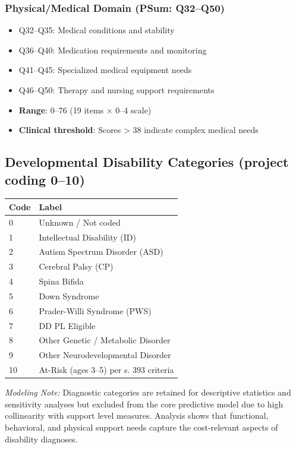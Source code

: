 \subsubsection{Physical/Medical Domain (PSum: Q32--Q50)}
\begin{itemize}
    \item Q32--Q35: Medical conditions and stability
    \item Q36--Q40: Medication requirements and monitoring
    \item Q41--Q45: Specialized medical equipment needs
    \item Q46--Q50: Therapy and nursing support requirements
    \item \textbf{Range}: 0--76 (19 items × 0--4 scale)
    \item \textbf{Clinical threshold}: Scores > 38 indicate complex medical needs
\end{itemize}

\subsection{Developmental Disability Categories (project coding 0--10)}

\begin{center}
\begin{tabular}{|l|l|}
\hline
\textbf{Code} & \textbf{Label} \\
\hline
0  & Unknown / Not coded \\
1  & Intellectual Disability (ID) \\
2  & Autism Spectrum Disorder (ASD) \\
3  & Cerebral Palsy (CP) \\
4  & Spina Bifida \\
5  & Down Syndrome \\
6  & Prader-Willi Syndrome (PWS) \\
7  & DD PL Eligible \\
8  & Other Genetic / Metabolic Disorder \\
9  & Other Neurodevelopmental Disorder \\
10 & At-Risk (ages 3--5) per s. 393 criteria \\
\hline
\end{tabular}
\end{center}

\textit{Modeling Note:} Diagnostic categories are retained for descriptive statistics and sensitivity analyses but excluded from the core predictive model due to high collinearity with support level measures. Analysis shows that functional, behavioral, and physical support needs capture the cost-relevant aspects of disability diagnoses.

